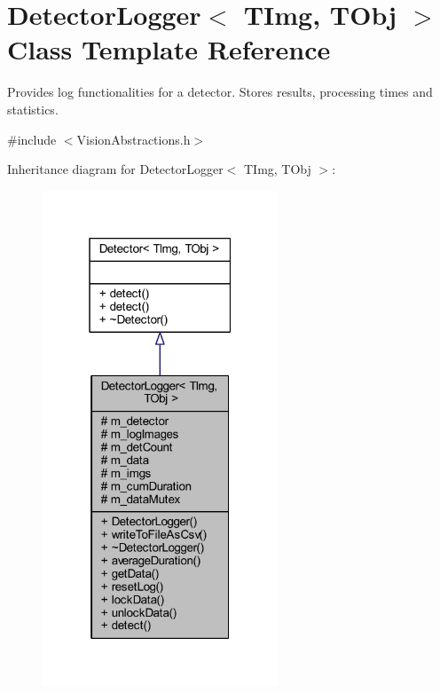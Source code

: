 \hypertarget{class_vision_core_1_1_abstractions_1_1_detector_logger}{}\section{Detector\+Logger$<$ T\+Img, T\+Obj $>$ Class Template Reference}
\label{class_vision_core_1_1_abstractions_1_1_detector_logger}


Provides log functionalities for a detector. Stores results, processing times and statistics.  




{\ttfamily \#include $<$Vision\+Abstractions.\+h$>$}



Inheritance diagram for Detector\+Logger$<$ T\+Img, T\+Obj $>$\+:
\nopagebreak
\begin{figure}[H]
\begin{center}
\leavevmode
\includegraphics[width=199pt]{class_vision_core_1_1_abstractions_1_1_detector_logger__inherit__graph}
\end{center}
\end{figure}


